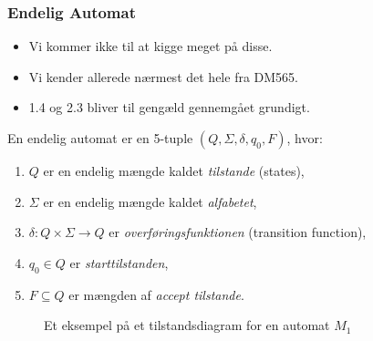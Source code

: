 \begin{frame}[allowframebreaks]
	\frametitle{Endelig Automat}

	\begin{itemize}
		\item Vi kommer ikke til at kigge meget på disse.
		\item Vi kender allerede nærmest det hele fra DM565.
		\item 1.4 og 2.3 bliver til gengæld gennemgået grundigt.
	\end{itemize}


	\begin{definition}
		En endelig automat er en 5-tuple $(Q, \Sigma, \delta, q_{0}, F)$, hvor:
		\begin{enumerate}
			\item $Q$ er en endelig mængde kaldet \textit{tilstande} (states),
			\item $\Sigma$ er en endelig mængde kaldet \textit{alfabetet},
			\item $\delta : Q \times \Sigma \longrightarrow Q$ er \textit{overføringsfunktionen} (transition function),
			\item $q_{0} \in Q$ er \textit{starttilstanden},
			\item $F \subseteq Q$ er mængden af \textit{accept tilstande}.
		\end{enumerate}
	\end{definition}

	\begin{figure}[ht]
		\centering
		\caption{\label{fig:sipser1.6} Et eksempel på et tilstandsdiagram for en automat $M_{1}$}
	\end{figure}


\end{frame}
